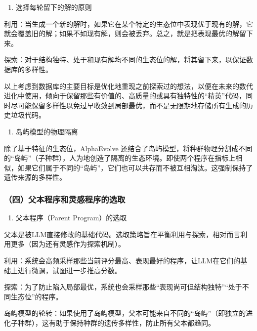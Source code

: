 \begin{enumerate}
\def\labelenumi{\arabic{enumi}.}
\setcounter{enumi}{1}
\tightlist
\item
  选择每轮留下的解的原则
\end{enumerate}

利用：当生成一个新的解时，如果它在某个特定的生态位中表现优于现有的解，它就会覆盖旧的解；如果不如现有解，则会被丢弃。总之，就是把表现最优的解留下来。

探索：对于结构独特、处于和现有解均不同的生态位的解，将其留下来，以保证数据库的多样性。

以上考虑到数据库的主要目标是优化地重现之前探索过的想法，以便在未来的数代进化中使用，倾向于保留那些有价值的、高质量的或具有独特性的``精英''代码，同时尽可能保留多样性以免过早收敛到局部最优，而不是无限期地存储所有生成的历史垃圾代码。

\begin{enumerate}
\def\labelenumi{\arabic{enumi}.}
\setcounter{enumi}{2}
\tightlist
\item
  岛屿模型的物理隔离
\end{enumerate}

除了基于特征的生态位，AlphaEvolve 还结合了岛屿模型，将种群物理分割成不同的``岛屿''（子种群），人为地创造了隔离的生态环境。即使两个程序在指标上相似，如果它们属于不同的``岛屿''，它们也可以共存而不被互相淘汰。这强制保持了遗传来源的多样性。

\hypertarget{ux56dbux7236ux672cux7a0bux5e8fux548cux7075ux611fux7a0bux5e8fux7684ux9009ux53d6}{%
\subsubsection{（四）父本程序和灵感程序的选取}\label{ux56dbux7236ux672cux7a0bux5e8fux548cux7075ux611fux7a0bux5e8fux7684ux9009ux53d6}}

\begin{enumerate}
\def\labelenumi{\arabic{enumi}.}
\tightlist
\item
  父本程序（Parent Program）的选取
\end{enumerate}

父本是被LLM直接修改的基础代码。选取策略旨在平衡利用与探索，相对而言利用更多（因为还有灵感作为探索机制）。

利用：系统会高频采样那些当前评分最高、表现最好的程序，让LLM在它们的基础上进行微调，试图进一步推高分数。

探索：为了防止陷入局部最优，系统也会采样那些``表现尚可但结构独特''``处于不同生态位''的程序。

岛屿模型的轮转：如果使用了岛屿模型，父本可能来自不同的``岛屿''（即独立的进化子种群），这有助于保持种群的遗传多样性，防止所有父本都趋同。

